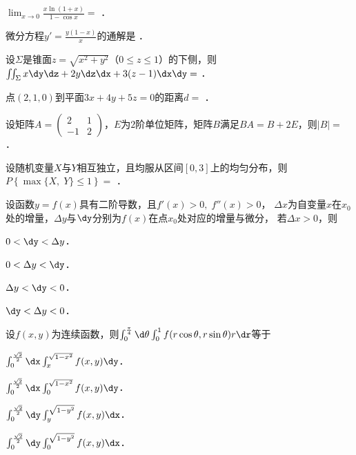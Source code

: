 \documentclass[plain,noanswer,medmath]{../../template/jnuexam}
\begin{document}




\begin{problem}
$\lim_{x \to 0} \frac{x\ln(1 + x)}{1 - \cos x} =$ \fillin{}．
\end{problem}


\begin{problem}
微分方程$y' = \frac{y(1 - x)}{x}$的通解是 \fillin{}．
\end{problem}


\begin{problem}
设$\Sigma$是锥面$z = \sqrt{x^2 + y^2}$（$0 \le z \le 1$）的下侧，则\goodbreak
$\iint_{\Sigma}x\dy\dz + 2y\dz\dx + 3(z - 1)\dx\dy =$ \fillin{}．
\end{problem}


\begin{problem}
点$(2,1,0)$到平面$3x + 4y + 5z = 0$的距离$d=$ \fillin{}．
\end{problem}


\begin{problem}
设矩阵$A = \begin{pmatrix}
   2 & 1 \\
  -1 & 2
\end{pmatrix}$，$E$为$2$阶单位矩阵，矩阵$B$满足$BA = B + 2E$，则$|B| =$ \fillin{}．
\end{problem}


\begin{problem}
设随机变量$X$与$Y$相互独立，且均服从区间$[0,3]$上的均匀分布，则\goodbreak
$P\left\{\max \{X,\;Y\} \le 1 \right\} =$ \fillin{}．
\end{problem}




\begin{problem}
设函数$y = f(x)$具有二阶导数，且$f'(x) > 0,\;f''(x) > 0$，
$\Delta x$为自变量$x$在$x_0$处的增量，$\Delta y$与$\dy$分别为$f(x)$在点$x_0$处对应的增量与微分，
若$\Delta x > 0$，则\pickout{}
\begin{abcd}
\item $0 < \dy < \Delta y$．
\item $0 < \Delta y < \dy$．
\item $\Delta y < \dy < 0$．
\item $\dy < \Delta y < 0$．
\end{abcd}
\end{problem}


\begin{problem}
设$f(x,y)$为连续函数，则$\int_0^{\frac{\pi}{4}}\d\theta\int_0^1 f(r\cos\theta,r\sin\theta)r\dr$等于\pickout{}
\begin{abcd}
\item $\int_0^{\frac{\sqrt{2}}{2}} \dx \int_x^{\sqrt{1 - x^2}} f(x,y)\dy$．
\item $\int_0^{\frac{\sqrt{2}}{2}} \dx \int_0^{\sqrt{1 - x^2}} f(x,y)\dy$．
\item $\int_0^{\frac{\sqrt{2}}{2}} \dy \int_y^{\sqrt{1 - y^2}} f(x,y)\dx$．
\item $\int_0^{\frac{\sqrt{2}}{2}} \dy \int_0^{\sqrt{1 - y^2}} f(x,y)\dx$．
\end{abcd}
\end{problem}
\end{document}
